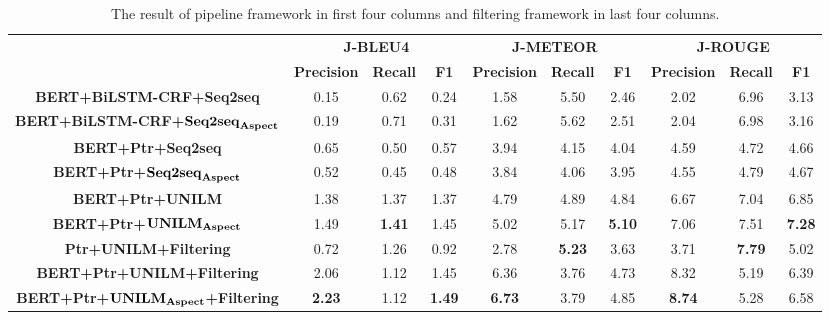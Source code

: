 \begin{table*}[h]
\scriptsize
\centering
\begin{tabular}{cccccccccc}
\toprule[1.5pt]
 & \multicolumn{3}{c}{\textbf{J-BLEU4}} & \multicolumn{3}{c}{\textbf{J-METEOR}} & \multicolumn{3}{c}{\textbf{J-ROUGE}} \\ 
 & \textbf{Precision} & \textbf{Recall} & \textbf{F1} & \textbf{Precision} & \textbf{Recall} & \textbf{F1} & \textbf{Precision} & \textbf{Recall} & \textbf{F1} \\ 
 \midrule
 \textbf{BERT+BiLSTM-CRF+Seq2seq} &  0.15  &  0.62  &  0.24  &  1.58  &  5.50  &  2.46  &  2.02  &  6.96  &  3.13 \\
 \textbf{BERT+BiLSTM-CRF+}$\text{\textbf{Seq2seq}}_{\text{\textbf{Aspect}}}$ & 0.19  &  0.71  &  0.31  &  1.62  &  5.62  &  2.51  &  2.04  &  6.98  &  3.16 \\
\textbf{BERT+Ptr+Seq2seq} & 0.65  &  0.50  &  0.57  &  3.94  &  4.15  &  4.04  &  4.59  &  4.72  &  4.66  \\ 
\textbf{BERT+Ptr+}$\text{\textbf{Seq2seq}}_{\text{\textbf{Aspect}}}$  & 0.52  &  0.45  &  0.48  &  3.84  &  4.06  &  3.95  &  4.55  &  4.79  &  4.67   \\ 
\textbf{BERT+Ptr+UNILM} & 1.38  &  1.37  &  1.37  &  4.79  &  4.89  &  4.84  &  6.67  &  7.04  &  6.85 
  \\ 
\textbf{BERT+Ptr+}$\text{\textbf{UNILM}}_{\text{\textbf{Aspect}}}$ & 1.49  &  \textbf{1.41}  &  1.45  &  5.02  &  5.17  &  \textbf{5.10}  &  7.06  &  7.51  &  \textbf{7.28}  \\ 
\midrule
\textbf{Ptr+UNILM+Filtering} & 0.72   &  1.26  &  0.92   & 2.78 &  \textbf{5.23}  & 3.63  & 3.71 &   \textbf{7.79} &  5.02  \\ \midrule
\textbf{BERT+Ptr+UNILM+Filtering} & 2.06 & 1.12 & 1.45 & 6.36 &  3.76  & 4.73  & 8.32 & 5.19  & 6.39  \\ 
\textbf{BERT+Ptr+}$\text{\textbf{UNILM}}_{\text{\textbf{Aspect}}}$\textbf{+Filtering} & \textbf{2.23}  &  1.12  &  \textbf{1.49}  &  \textbf{6.73}  &  3.79  &  4.85  &  \textbf{8.74}  &  5.28  &  6.58   \\ 
\bottomrule[1.5pt]
\end{tabular}
\caption{\label{tab:allres} The result of pipeline framework in first four columns and filtering framework in last four columns.}
\end{table*}

